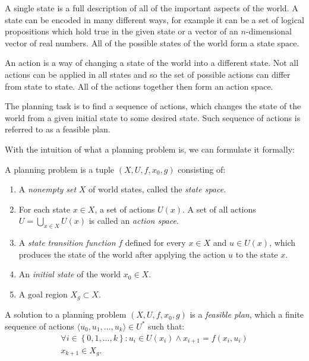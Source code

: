A single state is a full description of all of the important aspects of the world. A state can be encoded in many different ways, for example it can be a set of logical propositions which hold true in the given state or a vector of an $n$-dimensional vector of real numbers. All of the possible states of the world form a state space.

An action is a way of changing a state of the world into a different state. Not all actions can be applied in all states and so the set of possible actions can differ from state to state. All of the actions together then form an action space.

The planning task is to find a sequence of actions, which changes the state of the world from a given initial state to some desired state. Such sequence of actions is referred to as a feasible plan.

With the intuition of what a planning problem is, we can formulate it formally:

\begin{defn}
	\label{def:basic_planning_problem}
	A planning problem is a tuple $\left(X, U, f, x_0, g\right)$ consisting of:
	
	\begin{enumerate}
		\item A \textit{nonempty set} $X$ of world states, called the \textit{state space}.
		\item For each state $x\in X$, a set of actions $U(x)$.  A set of all actions $U=\bigcup\limits_{x\in X} U(x)$ is called an \textit{action space}.
		\item A \textit{state transition function} $f$ defined for every $x\in X$ and $u\in U(x)$, which produces the state of the world after applying the action $u$ to the state $x$.
		\item An \textit{initial state} of the world $x_0\in X$.
		\item A goal region $X_g\subset X$.
	\end{enumerate}
\end{defn}

\begin{defn}
	A solution to a planning problem $\left(X, U, f, x_0, g\right)$ is a \textit{feasible plan}, which a finite sequence of actions $\langle u_0, u_1, \ldots, u_k\rangle\in U^*$ such that:	
	\begin{gather*}
		\forall i \in \left\{0,1,\ldots,k\right\}: u_i\in U(x_i) \wedge x_{i+1}=f(x_i, u_i) \\
		x_{k+1} \in X_g.
	\end{gather*}
\end{defn}

